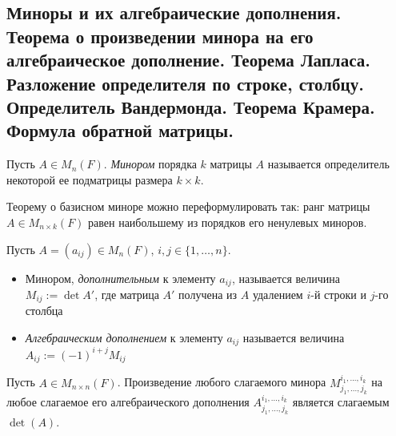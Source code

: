 \subsection{Миноры и их алгебраические дополнения. Теорема о произведении минора на его алгебраическое дополнение. Теорема Лапласа. Разложение определителя по строке, столбцу. Определитель Вандермонда. Теорема Крамера. Формула обратной матрицы.}

\begin{definition}
	Пусть $A \in M_n(F)$. \textit{Минором} порядка $k$ матрицы $A$ называется определитель некоторой ее подматрицы размера $k \times k$.
\end{definition}

\begin{note}
	Теорему о базисном миноре можно переформулировать так: ранг матрицы $A \in M_{n \times k}(F)$ равен наибольшему из порядков его ненулевых миноров.
\end{note}

\begin{definition}
	Пусть $A = (a_{ij}) \in M_n(F)$, $i, j \in \{1, \dotsc, n\}$.
	\begin{itemize}
		\item Минором, \textit{дополнительным} к элементу $a_{ij}$, называется величина $M_{ij} := \det{A'}$, где матрица $A'$ получена из $A$ удалением $i$-й строки и $j$-го столбца
		\item \textit{Алгебраическим дополнением} к элементу $a_{ij}$ называется величина $A_{ij} := (-1)^{i + j}M_{ij}$
	\end{itemize}
\end{definition}

\begin{theorem}
    Пусть $A \in M_{n \times n}(F)$. Произведение любого слагаемого минора $M_{j_{1}, ..., j_{k}}^{i_{1}, ..., i_{k}}$ на любое слагаемое его алгебраического дополнения $A_{j_{1}, ..., j_{k}}^{i_{1}, ..., i_{k}}$ является слагаемым $\det(A)$.
\end{theorem}

